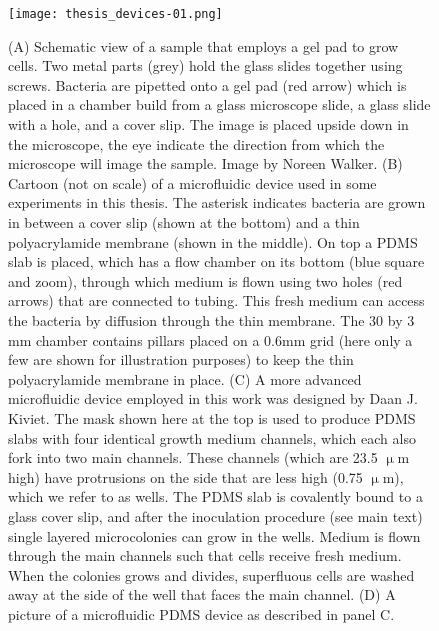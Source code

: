 %
%

\begin{figure}
	\centering
	\texttt{[image: thesis\_devices-01.png]}
	\caption{ 
		(A) Schematic view of a sample that employs a gel pad to grow cells. Two metal parts (grey) hold the glass slides together using screws. Bacteria are pipetted onto a gel pad (red arrow) which is placed in a chamber build from a glass microscope slide, a glass slide with a hole, and a cover slip. The image is placed upside down in the microscope, the eye indicate the direction from which the microscope will image the sample. Image by Noreen Walker.
		(B) Cartoon (not on scale) of a microfluidic device used in some experiments in this thesis. 
		The asterisk indicates bacteria are grown in between a cover slip (shown at the bottom) and a thin polyacrylamide membrane (shown in the middle).
		On top a PDMS slab is placed, which has a flow chamber on its bottom (blue square and zoom), through which medium is flown using two holes (red arrows) that are connected to tubing. 
		This fresh medium can access the bacteria by diffusion through the thin membrane. 
		The 30 by 3 mm chamber contains pillars placed on a 0.6mm grid (here only a few are shown for illustration purposes) to keep the thin polyacrylamide membrane in place. 
		(C) A more advanced microfluidic device employed in this work was designed by Daan J. Kiviet. 
		The mask shown here at the top is used to produce PDMS slabs with four identical growth medium channels, which each also fork into two main channels. 
		These channels (which are 23.5 $\upmu$m high) have protrusions on the side that are less high (0.75 $\upmu$m), which we refer to as wells.
		The PDMS slab is covalently bound to a glass cover slip, and after the inoculation procedure (see main text) single layered microcolonies can grow in the wells.
		Medium is flown through the main channels such that cells receive fresh medium. 
		When the colonies grows and divides, superfluous cells are washed away at the side of the well that faces the main channel.		
		(D) A picture of a microfluidic PDMS device as described in panel C.
	}
	\label{fig:mm:devices}
\end{figure}


